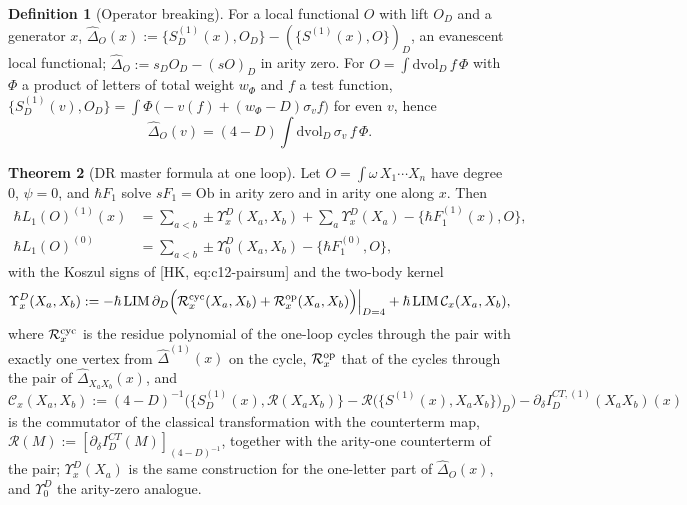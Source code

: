 \documentclass[11pt]{article}
\theoremstyle{definition}
\newtheorem{definition}{Definition}[section]
\newtheorem{theorem}[definition]{Theorem}
\numberwithin{equation}{section}
\begin{document}
\begin{definition}[Operator breaking]
\label{def:opbreak}
For a local functional $O$ with lift $O_D$ and a generator $x$, $\widehat\Delta_O(x):=\{S^{(1)}_D(x),O_D\}-(\{S^{(1)}(x),O\})_D$, an evanescent local functional; $\widehat\Delta_O:=s_DO_D-(sO)_D$ in arity zero. For $O=\int\mathrm{dvol}_D\,f\,\Phi$ with $\Phi$ a product of letters of total weight $w_\Phi$ and $f$ a test function, $\{S^{(1)}_D(v),O_D\}=\int\Phi\,\big(-v(f)+(w_\Phi-D)\sigma_vf\big)$ for even $v$, hence
\[
\widehat\Delta_O(v)=(4-D)\int\mathrm{dvol}_D\,\sigma_v\,f\,\Phi .
\]
\end{definition}

\begin{theorem}[DR master formula at one loop]
\label{thm:master}
Let $O=\int\omega\,X_1\cdots X_n$ have degree $0$, $\psi=0$, and $\hbar F_1$ solve $sF_1=\mathrm{Ob}$ in arity zero and in arity one along $x$. Then
\begin{equation}
\begin{aligned}
\hbar L_1(O)^{(1)}(x)&=\sum_{a<b}\pm\Upsilon^D_x(X_a,X_b)+\sum_a\Upsilon^D_x(X_a)-\{\hbar F^{(1)}_1(x),O\},\\
\hbar L_1(O)^{(0)}&=\sum_{a<b}\pm\Upsilon^D_0(X_a,X_b)-\{\hbar F^{(0)}_1,O\},
\end{aligned}
\label{eq:masterD}
\end{equation}
with the Koszul signs of [HK, eq:c12-pairsum] and the two-body kernel
\[
\Upsilon^D_x(X_a,X_b):=-\hbar\,\mathrm{LIM}\,\partial_D\Big(\mathcal R^{\rm cyc}_x(X_a,X_b)+\mathcal R^{\rm op}_x(X_a,X_b)\Big)\Big|_{D=4}+\hbar\,\mathrm{LIM}\,\mathcal C_x(X_a,X_b),
\]
where $\mathcal R^{\rm cyc}_x$ is the residue polynomial of the one-loop cycles through the pair with exactly one vertex from $\widehat\Delta^{(1)}(x)$ on the cycle, $\mathcal R^{\rm op}_x$ that of the cycles through the pair of $\widehat\Delta_{X_aX_b}(x)$, and
\[
\mathcal C_x(X_a,X_b):=(4-D)^{-1}\Big(\big\{S^{(1)}_D(x),\mathcal R(X_aX_b)\big\}-\mathcal R\big(\{S^{(1)}(x),X_aX_b\}\big)_D\Big)-\partial_\delta I^{CT,(1)}_D(X_aX_b)(x)
\]
is the commutator of the classical transformation with the counterterm map, $\mathcal R(M):=[\partial_\delta I^{CT}_D(M)]_{(4-D)^{-1}}$, together with the arity-one counterterm of the pair; $\Upsilon^D_x(X_a)$ is the same construction for the one-letter part of $\widehat\Delta_O(x)$, and $\Upsilon^D_0$ the arity-zero analogue.
\end{theorem}
\end{document}
